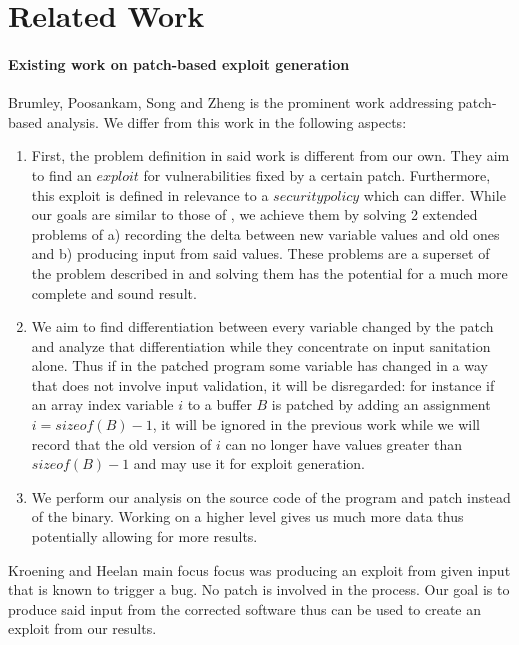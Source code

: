 \section{Related Work}\label{Sec:Related}

\paragraph{Existing work on patch-based exploit generation}
Brumley, Poosankam, Song and Zheng \cite{AutoPatch} is the prominent work addressing patch-based analysis. We differ from this work in the following aspects:
\begin{enumerate}
\item First, the problem definition in said work is different from our own. They aim to find an $exploit$ for vulnerabilities fixed by a certain patch. Furthermore, this exploit is defined in relevance to a $security policy$ which can differ. While our goals are similar to those of \cite{AutoPatch}, we achieve them by solving 2 extended problems of a) recording the delta between new variable values and old ones and b) producing input from said values. These problems are a superset of the problem described in \cite{AutoPatch} and solving them has the potential for a much more complete and sound result.
\item We aim to find differentiation between every variable changed by the patch and analyze that differentiation while they concentrate on input sanitation alone. Thus if in the patched program some variable has changed in a way that does not involve input validation, it will be disregarded: for instance if an array index variable $i$ to a buffer $B$ is patched by adding an assignment $i = sizeof(B) - 1$, it will be ignored in the previous work while we will record that the old version of $i$ can no longer have values greater than $sizeof(B) - 1$ and may use it for exploit generation.
\item We perform our analysis on the source code of the program and patch instead of the binary. Working on a higher level gives us much more data thus potentially allowing for more results.
\end{enumerate}

Kroening and Heelan \cite{AutoExploit} main focus focus was producing an exploit from given input that is known to trigger a bug. No patch is involved in the process. Our
goal is to produce said input from the corrected software thus \cite{AutoExploit} can be used to create an exploit from our results.

